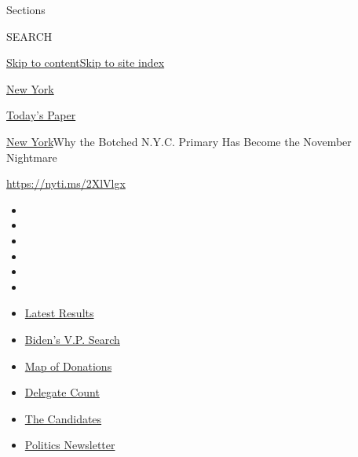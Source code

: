 Sections

SEARCH

\protect\hyperlink{site-content}{Skip to
content}\protect\hyperlink{site-index}{Skip to site index}

\href{https://www.nytimes3xbfgragh.onion/section/nyregion}{New York}

\href{https://myaccount.nytimes3xbfgragh.onion/auth/login?response_type=cookie\&client_id=vi}{}

\href{https://www.nytimes3xbfgragh.onion/section/todayspaper}{Today's
Paper}

\href{/section/nyregion}{New York}\textbar{}Why the Botched N.Y.C.
Primary Has Become the November Nightmare

\url{https://nyti.ms/2XlVlgx}

\begin{itemize}
\item
\item
\item
\item
\item
\item
\end{itemize}

\begin{itemize}
\item
  \href{https://www.nytimes3xbfgragh.onion/interactive/2020/08/04/us/elections/results-arizona-kansas-michigan-missouri-primaries.html?action=click\&pgtype=Article\&state=default\&region=TOP_BANNER\&context=storylines_menu}{Latest
  Results}
\item
  \href{https://www.nytimes3xbfgragh.onion/article/biden-vice-president-2020.html?action=click\&pgtype=Article\&state=default\&region=TOP_BANNER\&context=storylines_menu}{Biden's
  V.P. Search}
\item
  \href{https://www.nytimes3xbfgragh.onion/interactive/2020/07/24/us/politics/trump-biden-campaign-donors.html?action=click\&pgtype=Article\&state=default\&region=TOP_BANNER\&context=storylines_menu}{Map
  of Donations}
\item
  \href{https://www.nytimes3xbfgragh.onion/interactive/2020/us/elections/delegate-count-primary-results.html?action=click\&pgtype=Article\&state=default\&region=TOP_BANNER\&context=storylines_menu}{Delegate
  Count}
\item
  \href{https://www.nytimes3xbfgragh.onion/interactive/2019/us/politics/2020-presidential-candidates.html?action=click\&pgtype=Article\&state=default\&region=TOP_BANNER\&context=storylines_menu}{The
  Candidates}
\item
  \href{https://www.nytimes3xbfgragh.onion/newsletters/politics?action=click\&pgtype=Article\&state=default\&region=TOP_BANNER\&context=storylines_menu}{Politics
  Newsletter}
\end{itemize}

